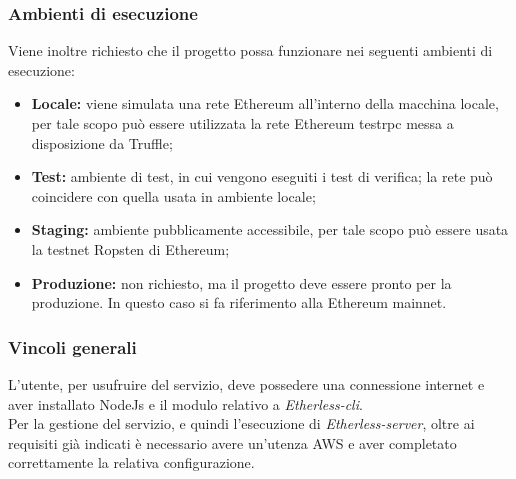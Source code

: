 \subsubsection{Ambienti di esecuzione}
Viene inoltre richiesto che il progetto possa funzionare nei seguenti ambienti di esecuzione: 
	\begin{itemize}
		\item \textbf{Locale:} viene simulata una rete Ethereum all'interno della macchina locale, per tale scopo può essere utilizzata la rete Ethereum  testrpc messa a disposizione da Truffle; 
		\item \textbf{Test:} ambiente di test, in cui vengono eseguiti i test di verifica; la rete può coincidere con quella usata in ambiente locale; 
		\item \textbf{Staging:} ambiente pubblicamente accessibile, per tale scopo può essere usata la testnet Ropsten di Ethereum;
		\item \textbf{Produzione:} non richiesto, ma il progetto deve essere pronto per la produzione. In questo caso si fa riferimento alla Ethereum mainnet. 
	\end{itemize}

\subsubsection{Vincoli generali}
L'utente, per usufruire del servizio, deve possedere una connessione internet e aver installato NodeJs e il modulo relativo a \textit{Etherless-cli}. \\ 
Per la gestione del servizio, e quindi l'esecuzione di \textit{Etherless-server}, oltre ai requisiti già indicati è necessario avere un'utenza AWS e aver completato correttamente la relativa configurazione. 

